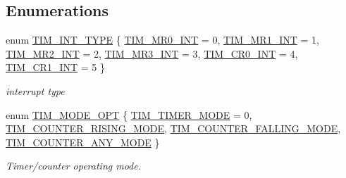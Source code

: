 \subsection*{\-Enumerations}
\begin{DoxyCompactItemize}
\item 
enum \hyperlink{group___t_i_m___public___types_ga2fd69882c6757b73b5728fd321d3104c}{\-T\-I\-M\-\_\-\-I\-N\-T\-\_\-\-T\-Y\-P\-E} \{ \*
\hyperlink{group___t_i_m___public___types_gga2fd69882c6757b73b5728fd321d3104ca1f5969f132559c9325f65ad81a8056fd}{\-T\-I\-M\-\_\-\-M\-R0\-\_\-\-I\-N\-T} = 0, 
\hyperlink{group___t_i_m___public___types_gga2fd69882c6757b73b5728fd321d3104cacb834e6383c7f8efe59c30ff1dc5199e}{\-T\-I\-M\-\_\-\-M\-R1\-\_\-\-I\-N\-T} = 1, 
\hyperlink{group___t_i_m___public___types_gga2fd69882c6757b73b5728fd321d3104ca59fecb1ec6d58862b13ea96e3a7e96c7}{\-T\-I\-M\-\_\-\-M\-R2\-\_\-\-I\-N\-T} = 2, 
\hyperlink{group___t_i_m___public___types_gga2fd69882c6757b73b5728fd321d3104ca98ab0c00d7955607fd427df8daf6b1d5}{\-T\-I\-M\-\_\-\-M\-R3\-\_\-\-I\-N\-T} = 3, 
\*
\hyperlink{group___t_i_m___public___types_gga2fd69882c6757b73b5728fd321d3104ca3229b87e9f2d525f9b7ec5adf1e7a28a}{\-T\-I\-M\-\_\-\-C\-R0\-\_\-\-I\-N\-T} = 4, 
\hyperlink{group___t_i_m___public___types_gga2fd69882c6757b73b5728fd321d3104ca3f56b43475ae3b63e3ca11e8a14b5e53}{\-T\-I\-M\-\_\-\-C\-R1\-\_\-\-I\-N\-T} = 5
 \}
\begin{DoxyCompactList}\small\item\em interrupt type \end{DoxyCompactList}\item 
enum \hyperlink{group___t_i_m___public___types_gacb2a94f8fe0bdfc2435033d97569dc2b}{\-T\-I\-M\-\_\-\-M\-O\-D\-E\-\_\-\-O\-P\-T} \{ \hyperlink{group___t_i_m___public___types_ggacb2a94f8fe0bdfc2435033d97569dc2bacf74772f4cddb0e473c26c1945de604e}{\-T\-I\-M\-\_\-\-T\-I\-M\-E\-R\-\_\-\-M\-O\-D\-E} =  0, 
\hyperlink{group___t_i_m___public___types_ggacb2a94f8fe0bdfc2435033d97569dc2ba00f763adb67928738604cc9989f1b25a}{\-T\-I\-M\-\_\-\-C\-O\-U\-N\-T\-E\-R\-\_\-\-R\-I\-S\-I\-N\-G\-\_\-\-M\-O\-D\-E}, 
\hyperlink{group___t_i_m___public___types_ggacb2a94f8fe0bdfc2435033d97569dc2ba63b720e820f8dd8f8b02022d8ad49157}{\-T\-I\-M\-\_\-\-C\-O\-U\-N\-T\-E\-R\-\_\-\-F\-A\-L\-L\-I\-N\-G\-\_\-\-M\-O\-D\-E}, 
\hyperlink{group___t_i_m___public___types_ggacb2a94f8fe0bdfc2435033d97569dc2ba268780dce906ef1ae0b7fcc39c8b2cb4}{\-T\-I\-M\-\_\-\-C\-O\-U\-N\-T\-E\-R\-\_\-\-A\-N\-Y\-\_\-\-M\-O\-D\-E}
 \}
\begin{DoxyCompactList}\small\item\em \-Timer/counter operating mode. \end{DoxyCompactList}\item 

\end{DoxyCompactItemize}
